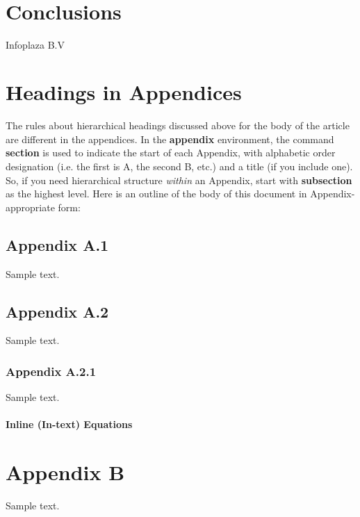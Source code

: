 \documentclass[acmtog, authorversion]{acmart}
\begin{document}
\medskip

\begin{ganttchart}{1}{12}
   \\
   \\
   \\
   \\
   \ganttnewline
\end{ganttchart}



\section{Conclusions}



\begin{acks}
Infoplaza B.V
\end{acks}




\appendix
\section{Headings in Appendices}
The rules about hierarchical headings discussed above for the body
of the article are different in the appendices. In the
\textbf{appendix} environment, the command \textbf{section} is
used to indicate the start of each Appendix, with alphabetic order
designation (i.e. the first is A, the second B, etc.) and a title
(if you include one).  So, if you need hierarchical structure
\textit{within} an Appendix, start with \textbf{subsection} as the
highest level. Here is an outline of the body of this document in
Appendix-appropriate form:
\subsection{Appendix A.1}
Sample text.
\subsection{Appendix A.2}
Sample text.
\subsubsection{Appendix A.2.1}
Sample text.

\paragraph{Inline (In-text) Equations}
\section{Appendix B}
Sample text.
\end{document}
